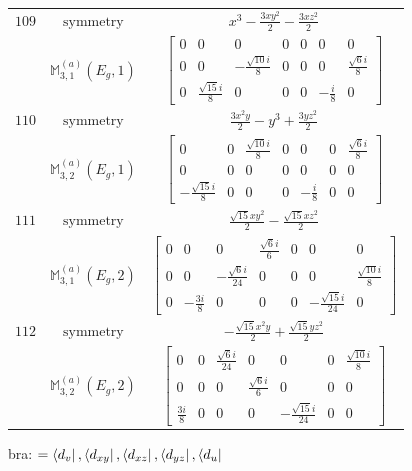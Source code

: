 \documentclass[fleqn,8pt,landscape]{jsarticle}
\begin{document}
\begin{longtable}{ccc}
$ 109 $ & $ \text{symmetry} $ & $ x^{3} - \frac{3 x y^{2}}{2} - \frac{3 x z^{2}}{2} $ \\
$  $ & $ \mathbb{M}_{3,1}^{(a)}(E_{g},1) $ & $ \begin{bmatrix} 0 & 0 & 0 & 0 & 0 & 0 & 0 \\ 0 & 0 & - \frac{\sqrt{10} i}{8} & 0 & 0 & 0 & \frac{\sqrt{6} i}{8} \\ 0 & \frac{\sqrt{15} i}{8} & 0 & 0 & 0 & - \frac{i}{8} & 0 \end{bmatrix} $ \\ \hline
$ 110 $ & $ \text{symmetry} $ & $ \frac{3 x^{2} y}{2} - y^{3} + \frac{3 y z^{2}}{2} $ \\
$  $ & $ \mathbb{M}_{3,2}^{(a)}(E_{g},1) $ & $ \begin{bmatrix} 0 & 0 & \frac{\sqrt{10} i}{8} & 0 & 0 & 0 & \frac{\sqrt{6} i}{8} \\ 0 & 0 & 0 & 0 & 0 & 0 & 0 \\ - \frac{\sqrt{15} i}{8} & 0 & 0 & 0 & - \frac{i}{8} & 0 & 0 \end{bmatrix} $ \\ \hline
$ 111 $ & $ \text{symmetry} $ & $ \frac{\sqrt{15} x y^{2}}{2} - \frac{\sqrt{15} x z^{2}}{2} $ \\
$  $ & $ \mathbb{M}_{3,1}^{(a)}(E_{g},2) $ & $ \begin{bmatrix} 0 & 0 & 0 & \frac{\sqrt{6} i}{6} & 0 & 0 & 0 \\ 0 & 0 & - \frac{\sqrt{6} i}{24} & 0 & 0 & 0 & \frac{\sqrt{10} i}{8} \\ 0 & - \frac{3 i}{8} & 0 & 0 & 0 & - \frac{\sqrt{15} i}{24} & 0 \end{bmatrix} $ \\ \hline
$ 112 $ & $ \text{symmetry} $ & $ - \frac{\sqrt{15} x^{2} y}{2} + \frac{\sqrt{15} y z^{2}}{2} $ \\
$  $ & $ \mathbb{M}_{3,2}^{(a)}(E_{g},2) $ & $ \begin{bmatrix} 0 & 0 & \frac{\sqrt{6} i}{24} & 0 & 0 & 0 & \frac{\sqrt{10} i}{8} \\ 0 & 0 & 0 & \frac{\sqrt{6} i}{6} & 0 & 0 & 0 \\ \frac{3 i}{8} & 0 & 0 & 0 & - \frac{\sqrt{15} i}{24} & 0 & 0 \end{bmatrix} $ \\ \hline
\end{longtable}
bra: $=\bra{d_{v}}, \bra{d_{xy}}, \bra{d_{xz}}, \bra{d_{yz}}, \bra{d_{u}}$
\end{document}
